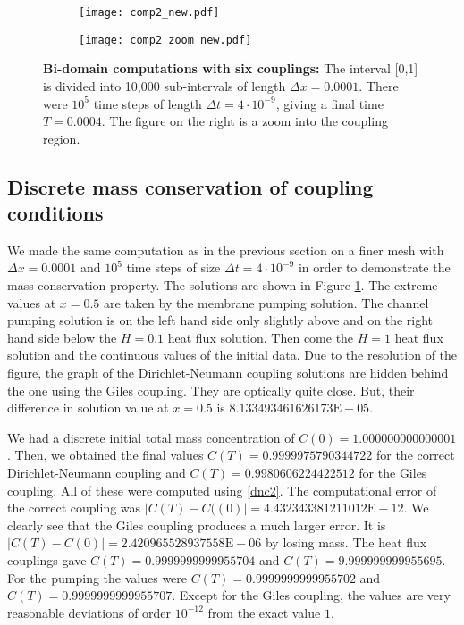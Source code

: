 %
\begin{figure}
%
\begin{subfigure}{.49\textwidth}
  \centering
  \texttt{[image: comp2\_new.pdf]}
  \caption{}
\end{subfigure}
%
\begin{subfigure}{.49\textwidth}
  \centering
  \texttt{[image: comp2\_zoom\_new.pdf]}
  \caption{}
\end{subfigure}
%
\caption{\textbf{Bi-domain computations with six couplings:} 
\label{comp2}
The interval [0,1] is divided into 10,000 sub-intervals of length $\Delta x=0.0001$. 
There were $10^5$ time steps of length $\Delta t=4\cdot 10^{-9}$, giving a final time $T=0.0004$. 
The figure on the right is a zoom into the coupling region.}
%
\end{figure}

%
%
\subsection{Discrete mass conservation of coupling conditions}
%
%

We made the same computation as in the previous section on a finer mesh with $\Delta x = 0.0001$ and $10^5$ time steps 
of size $\Delta t=4\cdot 10^{-9}$ in order to
demonstrate the mass conservation property. 
The solutions are shown in Figure \ref{comp2}. 
The extreme values at $x=0.5$ are taken by the membrane pumping solution. 
The channel pumping solution is on the left hand side only slightly above and on the right hand side
below the $H=0.1$ heat flux solution. Then come the $H=1$ heat flux solution 
and the continuous values of the initial data.
Due to the resolution of the figure, the graph of the
Dirichlet-Neumann coupling solutions are hidden behind the one using 
the Giles coupling. They are optically quite close. 
But, their difference in solution value at $x=0.5$ is $8.133493461626173\text{E}-05$.

We had a discrete initial total mass concentration of
$C(0)=1.000000000000001$. Then, we obtained the final values 
$C(T)=0.9999975790344722$ for the correct Dirichlet-Neumann coupling and 
$C(T)=0.9980606224422512$ for the Giles coupling. All of these were computed using \eqref{dnc2}.
The computational error of the correct coupling was $|C(T)-C((0)|=4.432343381211012\text{E}-12$. 
We clearly see that the Giles coupling produces 
a much larger error. It is $|C(T)-C(0)|=2.420965528937558\text{E}-06$ by losing mass.
The heat flux couplings gave $C(T) = 0.9999999999955704$
and $C(T)= 9.999999999955695$. For the pumping the values were $C(T) = 0.9999999999955702$ 
and $C(T) = 0.9999999999955707$. Except for the Giles coupling, the values 
are very reasonable deviations of order $10^{-12}$ from the exact value $1$.

